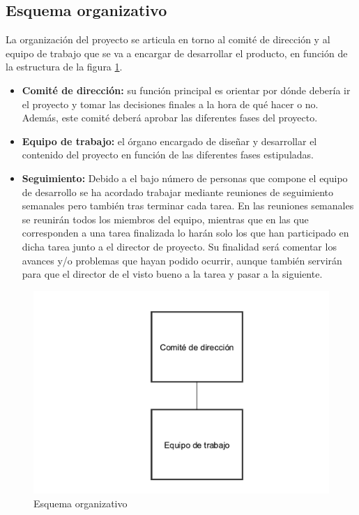 \subsection{Esquema organizativo}

La organización del proyecto se articula en torno al comité de dirección y al equipo de trabajo que se va a encargar de desarrollar el producto, en función de la estructura de la figura \ref{fig:org_schema}.

\begin{itemize}
	\item \textbf{Comité de dirección:} su función principal es orientar por dónde debería ir el proyecto y tomar las decisiones finales a la hora de qué hacer o no. Además, este comité deberá aprobar las diferentes fases del proyecto.
	\item \textbf{Equipo de trabajo:} el órgano encargado de diseñar y desarrollar el contenido del proyecto en función de las diferentes fases estipuladas.
	\item \textbf{Seguimiento:} Debido a el bajo número de personas que compone el equipo de desarrollo se ha acordado trabajar mediante reuniones de seguimiento semanales pero también tras terminar cada tarea. En las reuniones semanales se reunirán todos los miembros del equipo, mientras que en las que corresponden a una tarea finalizada lo harán solo los que han participado en dicha tarea junto a el director de proyecto. Su finalidad será comentar los avances y/o problemas que hayan podido ocurrir, aunque también servirán para que el director de el visto bueno a la tarea y pasar a la siguiente. 
\end{itemize}

\begin{figure}[!htp]
	\centering
	\includegraphics[scale=.75]{fig/organization}
	\caption{Esquema organizativo}\label{fig:org_schema}
\end{figure}